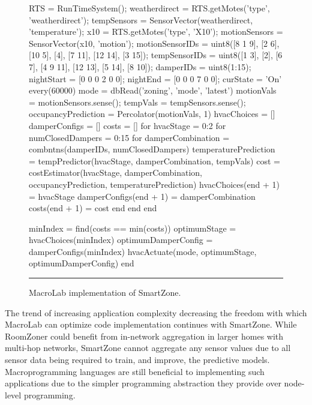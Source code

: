 \begin{figure}[!htb]
  \begin{macrolab}
RTS = RunTimeSystem();
weatherdirect = RTS.getMotes('type', 'weatherdirect');
tempSensors = SensorVector(weatherdirect, 'temperature');
x10 = RTS.getMotes('type', 'X10');
motionSensors = SensorVector(x10, 'motion');
motionSensorIDs = uint8({[8 1 9], [2 6], [10 5], [4], [7 11], [12 14], [3 15]});
tempSensorIDs = uint8({[1 3], [2], [6 7], [4 9 11], [12 13], [5 14], [8 10]}); 
damperIDs = uint8(1:15);
nightStart = [0 0 0 2 0 0];
nightEnd = [0 0 0 7 0 0];
curState = 'On'
every(60000)
  mode = dbRead('zoning', 'mode', 'latest')
  motionVals = motionSensors.sense();
  tempVals =  tempSensors.sense();
  occupancyPrediction = Percolator(motionVals, 1)
  hvacChoices = []
  damperConfigs = []
  costs = []
  for hvacStage = 0:2
    for numClosedDampers = 0:15
      for damperCombination = combntns(damperIDs, numClosedDampers)
        temperaturePrediction = tempPredictor(hvacStage, damperCombination, tempVals)  
        cost = costEstimator(hvacStage, damperCombination, occupancyPrediction,
        temperaturePrediction)
        hvacChoices(end + 1) = hvacStage
        damperConfigs(end + 1) = damperCombination
        costs(end + 1) = cost
      end
    end
  end

  minIndex = find(costs == min(costs))
  optimumStage = hvacChoices(minIndex)
  optimumDamperConfig = damperConfigs(minIndex)
  hvacActuate(mode, optimumStage, optimumDamperConfig)
end
  \end{macrolab}
  \smallskip
  \hrule width 1\columnwidth
  \caption{MacroLab implementation of SmartZone.}
  \label{code:cs3}
\end{figure}

The trend of increasing application complexity decreasing the freedom with which
MacroLab can optimize code implementation continues with SmartZone. While
RoomZoner could benefit from in-network aggregation in larger homes with
multi-hop networks, SmartZone cannot aggregate any sensor values due to all
sensor data being required to train, and improve, the predictive
models. Macroprogramming languages are still beneficial to implementing such
applications due to the simpler programming abstraction they provide over
node-level programming. 

